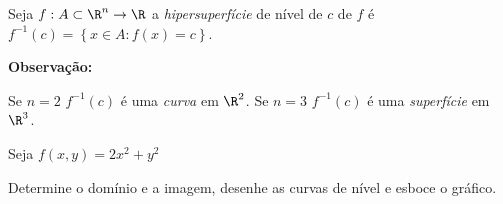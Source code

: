 \documentclass[11pt, oneside, a4paper]{gsm-l}
\begin{document}
\begin{defi}
    Seja $f:A \subset \R^n  \to \R$ a \textit{hipersuperfície} de nível de $c$ de $f$ é $f^{ - 1} \left( c \right) = \left\{ {x \in A:f\left( x \right) = c} \right\}$.
\end{defi}

\textbf{Observação:}

Se $n=2$ $f^{ - 1} \left( c \right)$ é uma \textit{curva} em $\R^2$.
Se $n=3$ $f^{ - 1} \left( c \right)$ é uma \textit{superfície} em $\R^3$.

\begin{exem}
Seja $f\left( {x,y} \right) = 2x^2  + y^2$

Determine o domínio e a imagem, desenhe as curvas de nível e esboce o gráfico.
\end{exem}
\end{document}
